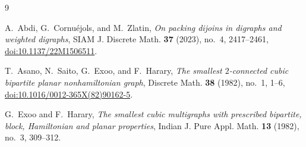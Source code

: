 \documentclass[11pt]{amsart}
\theoremstyle{remark}
\begin{document}
\begin{thebibliography}{9}

A.~Abdi, G.~Cornu\'ejols, and M.~Zlatin,
\newblock \emph{On packing dijoins in digraphs and weighted digraphs},
\newblock SIAM J. Discrete Math. \textbf{37} (2023), no.~4,
2417--2461,
\href{https://doi.org/10.1137/22M1506511}
{doi:10.1137/22M1506511}.

T.~Asano, N.~Saito, G.~Exoo, and F.~Harary,
\newblock \emph{The smallest $2$-connected cubic bipartite planar
nonhamiltonian graph},
\newblock Discrete Math. \textbf{38} (1982), no.~1, 1--6,
\href{https://doi.org/10.1016/0012-365X(82)90162-5}
{doi:10.1016/0012-365X(82)90162-5}.

G.~Exoo and F.~Harary,
\newblock \emph{The smallest cubic multigraphs with prescribed
bipartite, block, Hamiltonian and planar properties},
\newblock Indian J. Pure Appl. Math. \textbf{13} (1982), no.~3,
309--312.

\end{thebibliography}
\end{document}
